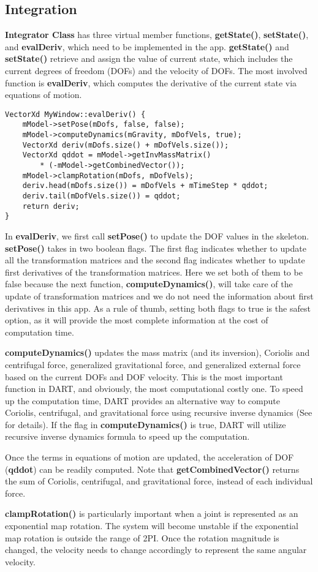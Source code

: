 \subsection{Integration}
\textbf{Integrator Class} has three virtual member functions,
\textbf{getState()}, \textbf{setState()}, and \textbf{evalDeriv},
which need to be implemented in the app. \textbf{getState()} and
\textbf{setState()} retrieve and assign the value of current state,
which includes the current degrees of freedom (DOFs) and the velocity
of DOFs. The most involved function is \textbf{evalDeriv}, which
computes the derivative of the current state via equations of motion.

\ttfamily
\begin{lstlisting}[label=evalDeriv,caption=evalDeriv]
VectorXd MyWindow::evalDeriv() {
    mModel->setPose(mDofs, false, false);
    mModel->computeDynamics(mGravity, mDofVels, true);
    VectorXd deriv(mDofs.size() + mDofVels.size());
    VectorXd qddot = mModel->getInvMassMatrix() 
        * (-mModel->getCombinedVector());
    mModel->clampRotation(mDofs, mDofVels);
    deriv.head(mDofs.size()) = mDofVels + mTimeStep * qddot;
    deriv.tail(mDofVels.size()) = qddot;
    return deriv;
}
\end{lstlisting}
\rmfamily
In \textbf{evalDeriv}, we first call \textbf{setPose()} to update the
DOF values in the skeleton. \textbf{setPose()} takes in two boolean
flags. The first flag indicates whether to update all the
transformation matrices and the second flag indicates whether to
update first derivatives of the transformation matrices. Here we set
both of them to be false because the next function, 
\textbf{computeDynamics()}, will take care of the update of
transformation matrices and we do not need the information about first
derivatives in this app. As a rule of thumb, setting both flags to
true is the safest option, as it will provide the most complete
information at the cost of computation time.

\textbf{computeDynamics()} updates the mass matrix (and its
inversion), Coriolis and centrifugal force, generalized gravitational force,
and generalized external force based on the current DOFs and DOF
velocity. This is the most important function in DART, and obviously,
the most computational costly one. To speed up the computation time,
DART provides an alternative way to compute Coriolis, centrifugal, and
gravitational force using recursive inverse dynamics (See
\cite{dynamics-tutorial} for details). If the flag in
\textbf{computeDynamics()} is true, DART will utilize recursive
inverse dynamics formula to speed up the computation.

Once the terms in equations of motion are updated, the acceleration of
DOF (\textbf{qddot}) can be readily computed. Note that
\textbf{getCombinedVector()} returns the sum of Coriolis, centrifugal,
and gravitational force, instead of each individual force.

\textbf{clampRotation() } is particularly important when a joint is
represented as an exponential map rotation. The system will become
unstable if the exponential map rotation is outside the range of
2PI. Once the rotation magnitude is changed, the velocity needs to
change accordingly to represent the same angular velocity.

